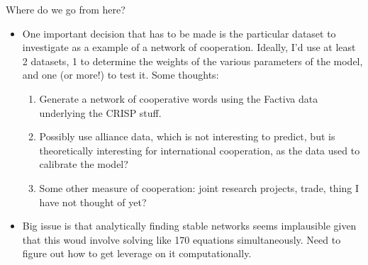 \documentclass{beamer}
\begin{document}
\begin{frame}{Where do we go from here?}
\begin{itemize}
\item One important decision that has to be made is the particular dataset to investigate as a example of a network of cooperation. Ideally, I'd use at least 2 datasets, 1 to determine the weights of the various parameters of the model, and one (or more!) to test it. Some thoughts:
\begin{enumerate}
\item Generate a network of cooperative words using the Factiva data underlying the CRISP stuff.
\item Possibly use alliance data, which is not interesting to predict, but is theoretically interesting for international cooperation, as the data used to calibrate the model?
\item Some other measure of cooperation: joint research projects, trade, thing I have not thought of yet?
\end{enumerate}
\item Big issue is that analytically finding stable networks seems implausible given that this woud involve solving like 170 equations simultaneously. Need to figure out how to get leverage on it computationally.
\end{itemize}
\end{frame}
\end{document}
